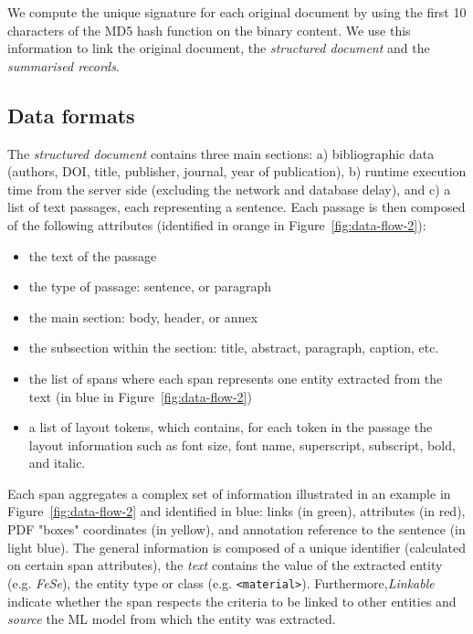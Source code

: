 \documentclass[a4paper]{article}
\begin{document}
We compute the unique signature for each original document by using the first 10 characters of the MD5 hash function on the binary content. 
We use this information to link the original document, the \textit{structured document} and the \textit{summarised records}.

\subsection{Data formats}
\label{subsec:data-formats}

The \textit{structured document} contains three main sections: a) bibliographic data (authors, DOI, title, publisher, journal, year of publication), b) runtime execution time from the server side (excluding the network and database delay), and c) a list of text passages, each representing a sentence.
Each passage is then composed of the following attributes (identified in orange in Figure~\ref{fig:data-flow-2}): 
\begin{itemize}
\item the text of the passage
\item the type of passage: sentence, or paragraph
\item the main section: body, header, or annex
\item the subsection within the section: title, abstract, paragraph, caption, etc.
\item the list of spans where each span represents one entity extracted from the text (in blue in Figure~\ref{fig:data-flow-2})
\item a list of layout tokens, which contains, for each token in the passage the layout information such as font size, font name, superscript, subscript, bold, and italic.
\end{itemize}

Each span aggregates a complex set of information illustrated in an example in Figure~\ref{fig:data-flow-2} and identified in blue:  links (in green), attributes (in red), PDF "boxes" coordinates (in yellow), and annotation reference to the sentence (in light blue). 
The general information is composed of a unique identifier (calculated on certain span attributes), the \textit{text} contains the value of the extracted entity (e.g. \textit{FeSe}), the entity type or class (e.g. \texttt{<material>}).
Furthermore,\textit{Linkable} indicate whether the span respects the criteria to be linked to other entities and \textit{source} the ML model from which the entity was extracted. 
\end{document}
